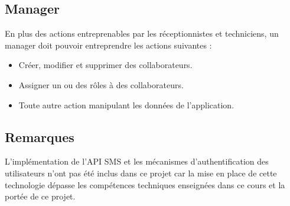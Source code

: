 \documentclass{article}
\begin{document}
\subsection*{Manager}
En plus des actions entreprenables par les réceptionnistes et techniciens, un manager doit pouvoir entreprendre les actions suivantes :
\begin{itemize}
    \item Créer, modifier et supprimer des collaborateurs.
    \item Assigner un ou des rôles à des collaborateurs.
    \item Toute autre action manipulant les données de l'application.
\end{itemize}

\subsection*{Remarques}
L'implémentation de l'API SMS et les mécanismes d'authentification des utilisateurs n'ont pas été inclus dans ce projet car la mise en place de cette technologie dépasse les compétences techniques enseignées dans ce cours et la portée de ce projet.
\end{document}
